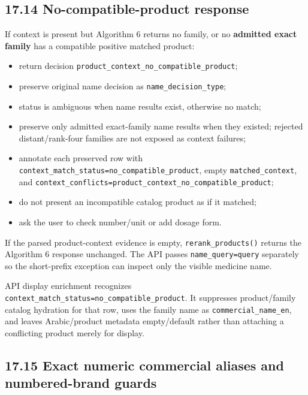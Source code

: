 \subsection{17.14 No-compatible-product response}\label{1714-no-compatible-product-response}

If context is present but Algorithm 6 returns no family, or no \textbf{admitted exact family} has a compatible positive matched product:

\begin{itemize}
\tightlist
\item
  return decision \texttt{product\_\allowbreak{}context\_\allowbreak{}no\_\allowbreak{}compatible\_\allowbreak{}product};
\item
  preserve original name decision as \texttt{name\_\allowbreak{}decision\_\allowbreak{}type};
\item
  status is ambiguous when name results exist, otherwise no match;
\item
  preserve only admitted exact-family name results when they existed; rejected distant/rank-four families are not exposed as context failures;
\item
  annotate each preserved row with \texttt{context\_\allowbreak{}match\_\allowbreak{}status=no\_\allowbreak{}compatible\_\allowbreak{}product}, empty \texttt{matched\_\allowbreak{}context}, and \texttt{context\_\allowbreak{}conflicts=product\_\allowbreak{}context\_\allowbreak{}no\_\allowbreak{}compatible\_\allowbreak{}product};
\item
  do not present an incompatible catalog product as if it matched;
\item
  ask the user to check number/unit or add dosage form.
\end{itemize}

If the parsed product-context evidence is empty, \texttt{rerank\_\allowbreak{}products()} returns the Algorithm 6 response unchanged. The API passes \texttt{name\_\allowbreak{}query=query} separately so the short-prefix exception can inspect only the visible medicine name.

API display enrichment recognizes \texttt{context\_\allowbreak{}match\_\allowbreak{}status=no\_\allowbreak{}compatible\_\allowbreak{}product}. It suppresses product/family catalog hydration for that row, uses the family name as \texttt{commercial\_\allowbreak{}name\_\allowbreak{}en}, and leaves Arabic/product metadata empty/default rather than attaching a conflicting product merely for display.

\subsection{17.15 Exact numeric commercial aliases and numbered-brand guards}\label{1715-exact-numeric-commercial-aliases-and-numbered-brand-guards}


